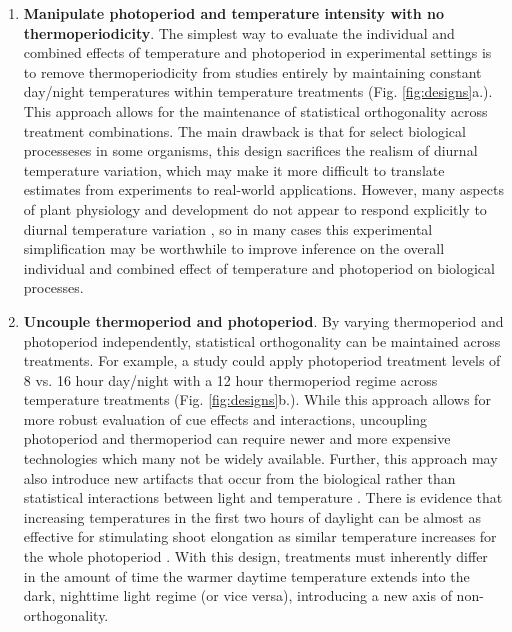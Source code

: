 \documentclass[11pt]{article}
\begin{document}
\begin{enumerate}
\item \textbf{Manipulate photoperiod and temperature intensity with no thermoperiodicity}. The simplest way to evaluate the individual and combined effects of temperature and photoperiod in experimental settings is to remove thermoperiodicity from studies entirely by maintaining constant day/night temperatures within temperature treatments (Fig. \ref{fig:designs}a.). This approach allows for the maintenance of statistical orthogonality across treatment combinations. The main drawback is that for select biological processeses in some organisms, this design sacrifices the realism of diurnal temperature variation, which may make it more difficult to translate estimates from experiments to real-world applications. However, many aspects of plant physiology and development do not appear to respond explicitly to diurnal temperature variation \citep[e.g.,][]{Hellmers:1966wz,Warrington:1977vt,Bhatt:2019uu}, so in many cases this experimental simplification may be worthwhile to improve inference on the overall individual and combined effect of temperature and photoperiod on biological processes.

\item \textbf{Uncouple thermoperiod and photoperiod}. By varying thermoperiod and photoperiod independently, statistical orthogonality can be maintained across treatments. For example, a study could apply photoperiod treatment levels of 8 vs. 16 hour day/night with a 12 hour thermoperiod regime across temperature treatments (Fig. \ref{fig:designs}b.). While this approach allows for more robust evaluation of cue effects and interactions, uncoupling photoperiod and thermoperiod can require newer and more expensive technologies which many not be widely available. Further, this approach may also introduce new artifacts that occur from the biological rather than statistical interactions between light and temperature \citep{Chew:2012wj}. There is evidence that increasing temperatures in the first two hours of daylight can be almost as effective for stimulating shoot elongation as similar temperature increases for the whole photoperiod \citep{Erwin1998}. With this design, treatments must inherently differ in the amount of time the warmer daytime temperature extends into the dark, nighttime light regime (or vice versa), introducing a new axis of non-orthogonality.


\end{enumerate}
\end{document}
